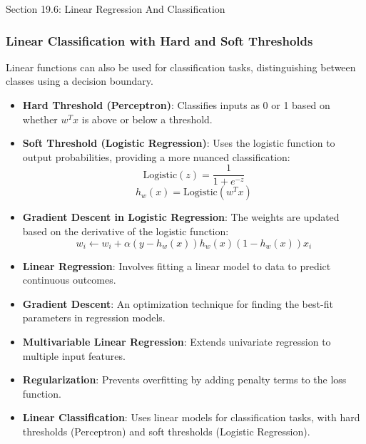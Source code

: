 \begin{notes}{Section 19.6: Linear Regression And Classification}
\begin{highlight}
    \end{highlight}
    
    \subsubsection*{Linear Classification with Hard and Soft Thresholds}
    
    Linear functions can also be used for classification tasks, distinguishing between classes using a decision boundary.
    
    \begin{highlight}
    
        \begin{itemize}
            \item \textbf{Hard Threshold (Perceptron)}: Classifies inputs as 0 or 1 based on whether $w^T x$ is above or below a threshold.
            \item \textbf{Soft Threshold (Logistic Regression)}: Uses the logistic function to output probabilities, providing a more nuanced classification:
            \[
            \text{Logistic}(z) = \frac{1}{1 + e^{-z}}
            \]
            \[
            h_w(x) = \text{Logistic}(w^T x)
            \]
            \item \textbf{Gradient Descent in Logistic Regression}: The weights are updated based on the derivative of the logistic function:
            \[
            w_i \leftarrow w_i + \alpha (y - h_w(x))h_w(x)(1 - h_w(x))x_i
            \]
        \end{itemize}
    
    \end{highlight}
    
    \begin{highlight}
    
        \begin{itemize}
            \item \textbf{Linear Regression}: Involves fitting a linear model to data to predict continuous outcomes.
            \item \textbf{Gradient Descent}: An optimization technique for finding the best-fit parameters in regression models.
            \item \textbf{Multivariable Linear Regression}: Extends univariate regression to multiple input features.
            \item \textbf{Regularization}: Prevents overfitting by adding penalty terms to the loss function.
            \item \textbf{Linear Classification}: Uses linear models for classification tasks, with hard thresholds (Perceptron) and soft thresholds (Logistic Regression).
        \end{itemize}
    

\end{highlight}
\end{notes}
